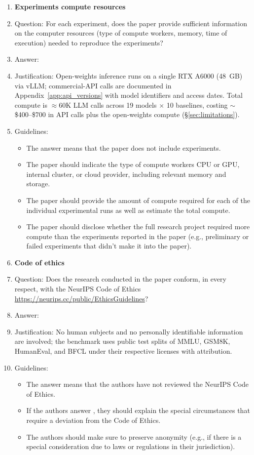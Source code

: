\documentclass[11pt]{article}
\begin{document}
\begin{enumerate}
\item {\bf Experiments compute resources}
    \item[] Question: For each experiment, does the paper provide sufficient information on the computer resources (type of compute workers, memory, time of execution) needed to reproduce the experiments?
    \item[] Answer: \answerYes{}
    \item[] Justification: Open-weights inference runs on a single RTX A6000 (48~GB) via vLLM; commercial-API calls are documented in Appendix~\ref{app:api_versions} with model identifiers and access dates. Total compute is $\approx 60$K LLM calls across 19 models $\times$ 10 baselines, costing $\sim$\$400--\$700 in API calls plus the open-weights compute (\S\ref{sec:limitations}).
    \item[] Guidelines:
    \begin{itemize}
        \item The answer \answerNA{} means that the paper does not include experiments.
        \item The paper should indicate the type of compute workers CPU or GPU, internal cluster, or cloud provider, including relevant memory and storage.
        \item The paper should provide the amount of compute required for each of the individual experimental runs as well as estimate the total compute.
        \item The paper should disclose whether the full research project required more compute than the experiments reported in the paper (e.g., preliminary or failed experiments that didn't make it into the paper).
    \end{itemize}

\item {\bf Code of ethics}
    \item[] Question: Does the research conducted in the paper conform, in every respect, with the NeurIPS Code of Ethics \url{https://neurips.cc/public/EthicsGuidelines}?
    \item[] Answer: \answerYes{}
    \item[] Justification: No human subjects and no personally identifiable information are involved; the benchmark uses public test splits of MMLU, GSM8K, HumanEval, and BFCL under their respective licenses with attribution.
    \item[] Guidelines:
    \begin{itemize}
        \item The answer \answerNA{} means that the authors have not reviewed the NeurIPS Code of Ethics.
        \item If the authors answer \answerNo, they should explain the special circumstances that require a deviation from the Code of Ethics.
        \item The authors should make sure to preserve anonymity (e.g., if there is a special consideration due to laws or regulations in their jurisdiction).
    \end{itemize}



\end{enumerate}
\end{document}
